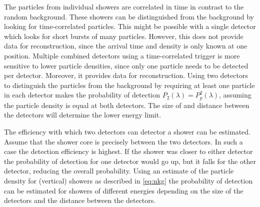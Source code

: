 The particles from individual showers are correlated in time in contrast to the random background. These showers can be distinguished from the background by looking for time-correlated particles. This might be possible with a single detector which looks for short bursts of many particles. However, this does not provide data for reconstruction, since the arrival time and density is only known at one position. Multiple combined detectors using a time-correlated trigger is more sensitive to lower particle densities, since only one particle needs to be detected per detector. Moreover, it provides data for reconstruction. Using two detectors to distinguish the particles from the background by requiring at least one particle in each detector makes the probability of detection $P_2(\lambda) = P_p^2(\lambda)$, assuming the particle density is equal at both detectors. The size of and distance between the detectors will determine the lower energy limit.

The efficiency with which two detectors can detector a shower can be estimated. Assume that the shower core is precisely between the two detectors. In such a case the detection efficiency is highest. If the shower was closer to either detector the probability of detection for one detector would go up, but it falls for the other detector, reducing the overall probability. Using an estimate of the particle density for (vertical) showers as described in \cref{eq:nkg} the probability of detection can be estimated for showers of different energies depending on the size of the detectors and the distance between the detectors.

